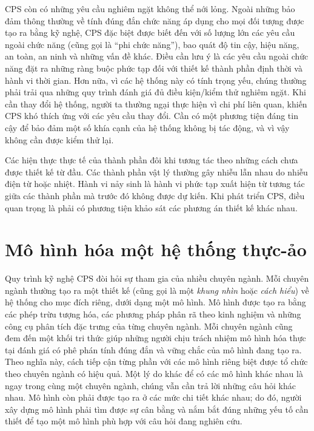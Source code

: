 CPS còn có những yêu cầu nghiêm ngặt không thể nới lỏng. Ngoài những bảo đảm thông thường về tính đúng đắn chức năng áp dụng cho mọi đối tượng được tạo ra bằng kỹ nghệ, CPS đặc biệt được biết đến với số lượng lớn các yêu cầu ngoài chức năng (cũng gọi là ``phi chức năng''), bao quát độ tin cậy, hiệu năng, an toàn, an ninh và những vấn đề khác. Điều cần lưu ý là các yêu cầu ngoài chức năng đặt ra những ràng buộc phức tạp đối với thiết kế thành phần định thời và hành vi thời gian. Hơn nữa, vì các hệ thống này có tính trọng yếu, chúng thường phải trải qua những quy trình đánh giá đủ điều kiện/kiểm thử nghiêm ngặt. Khi cần thay đổi hệ thống, người ta thường ngại thực hiện vì chi phí liên quan, khiến CPS khó thích ứng với các yêu cầu thay đổi. Cần có một phương tiện đáng tin cậy để bảo đảm một số khía cạnh của hệ thống không bị tác động, và vì vậy không cần được kiểm thử lại.

Các hiện thực thực tế của thành phần đôi khi tương tác theo những cách chưa được thiết kế từ đầu. Các thành phần vật lý thường gây nhiễu lẫn nhau do nhiễu điện từ hoặc nhiệt. Hành vi nảy sinh là hành vi phức tạp xuất hiện từ tương tác giữa các thành phần mà trước đó không được dự kiến. Khi phát triển CPS, điều quan trọng là phải có phương tiện khảo sát các phương án thiết kế khác nhau.

\section{Mô hình hóa một hệ thống thực-ảo}
Quy trình kỹ nghệ CPS đòi hỏi sự tham gia của nhiều chuyên ngành. Mỗi chuyên ngành thường tạo ra một thiết kế (cũng gọi là một \emph{khung nhìn} hoặc \emph{cách hiểu}) về hệ thống cho mục đích riêng, dưới dạng một mô hình. Mô hình được tạo ra bằng các phép trừu tượng hóa, các phương pháp phân rã theo kinh nghiệm và những công cụ phân tích đặc trưng của từng chuyên ngành. Mỗi chuyên ngành cũng đem đến một khối tri thức giúp những người chịu trách nhiệm mô hình hóa thực tại đánh giá có phê phán tính đúng đắn và vững chắc của mô hình đang tạo ra. Theo nghĩa này, cách tiếp cận từng phần với các mô hình riêng biệt được tổ chức theo chuyên ngành có hiệu quả. Một lý do khác để có các mô hình khác nhau là ngay trong cùng một chuyên ngành, chúng vẫn cần trả lời những câu hỏi khác nhau. Mô hình còn phải được tạo ra ở các mức chi tiết khác nhau; do đó, người xây dựng mô hình phải tìm được sự cân bằng và nắm bắt đúng những yếu tố cần thiết để tạo một mô hình phù hợp với câu hỏi đang nghiên cứu.


